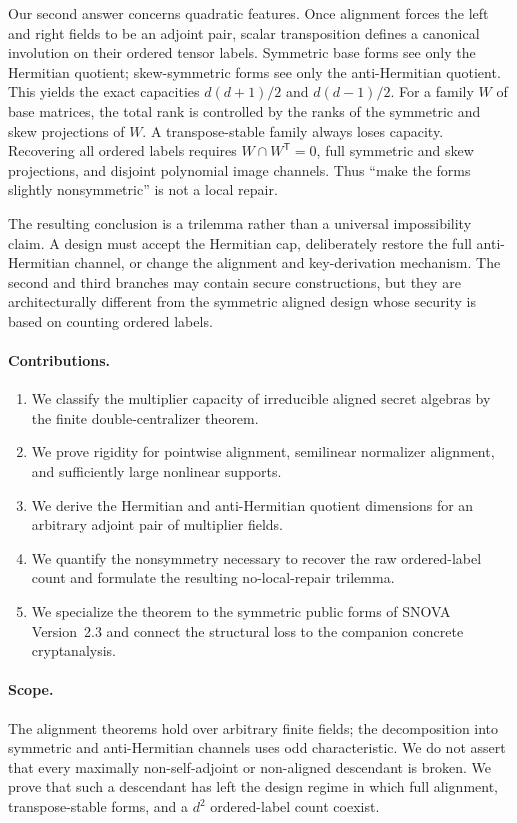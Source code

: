 \documentclass[11pt]{article}
\newcommand{\transpose}{\mathsf T}
\begin{document}
Our second answer concerns quadratic features.  Once alignment forces the
left and right fields to be an adjoint pair, scalar transposition defines a
canonical involution on their ordered tensor labels.  Symmetric base forms see
only the Hermitian quotient; skew-symmetric forms see only the anti-Hermitian
quotient.  This yields the exact capacities $d(d+1)/2$ and $d(d-1)/2$.
For a family $W$ of base matrices, the total rank is controlled by the ranks
of the symmetric and skew projections of $W$.  A transpose-stable family
always loses capacity.  Recovering all ordered labels requires
$W\cap W^\transpose=0$, full symmetric and skew projections, and disjoint
polynomial image channels.  Thus ``make the forms slightly nonsymmetric'' is
not a local repair.

The resulting conclusion is a trilemma rather than a universal impossibility
claim.  A design must accept the Hermitian cap, deliberately restore the full
anti-Hermitian channel, or change the alignment and key-derivation mechanism.
The second and third branches may contain secure constructions, but they are
architecturally different from the symmetric aligned design whose security is
based on counting ordered labels.

\paragraph{Contributions.}
\begin{enumerate}
\item We classify the multiplier capacity of irreducible aligned secret
      algebras by the finite double-centralizer theorem.
\item We prove rigidity for pointwise alignment, semilinear normalizer
      alignment, and sufficiently large nonlinear supports.
\item We derive the Hermitian and anti-Hermitian quotient dimensions for an
      arbitrary adjoint pair of multiplier fields.
\item We quantify the nonsymmetry necessary to recover the raw ordered-label
      count and formulate the resulting no-local-repair trilemma.
\item We specialize the theorem to the symmetric public forms of SNOVA
      Version~2.3 and connect the structural loss to the companion concrete
      cryptanalysis.
\end{enumerate}

\paragraph{Scope.}
The alignment theorems hold over arbitrary finite fields; the decomposition
into symmetric and anti-Hermitian channels uses odd characteristic.  We do not
assert that every maximally non-self-adjoint or non-aligned descendant is
broken.  We prove that such a descendant has left the design regime in which
full alignment, transpose-stable forms, and a $d^2$ ordered-label count coexist.
\end{document}
